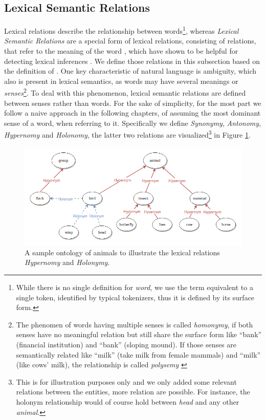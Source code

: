 \subsection{Lexical Semantic Relations}\label{sec:word_relations}
Lexical relations describe the relationship between words\footnote{While there is no single definition for \textit{word}, we use the term equivalent to a single token, identified by typical tokenizers, thus it is defined by its surface form.}, whereas \textit{Lexical Semantic Relations} are a special form of lexical relations, consisting of relations, that refer to the meaning of the word \citep{murphy2003semantic}, which have shown to be helpful for detecting lexical inferences \citep{dagan2009recognizing}. We define those relations in this subsection based on the definition of \cite{Jurafsky2008May}. One key characteristic of natural language is ambiguity, which also is present in lexical semantics, as words may have several meanings or \textit{senses}\footnote{The phenomen of words having multiple senses is called \textit{homonymy}, if both senses have no meaningful relation but still share the surface form like ``bank'' (financial institution) and ``bank'' (sloping mound). If those senses are semantically related like ``milk'' (take milk from female mammals) and ``milk'' (like cows' milk), the relationship is called \textit{polysemy} \citep{Jurafsky2008May}}. To deal with this phenomenon, lexical semantic relations are defined between senses rather than words. For the sake of simplicity, for the most part we follow a naive approach in the following chapters, of assuming the most dominant sense of a word, when referring to it. Specifically we define \textit{Synonymy}, \textit{Antonomy}, \textit{Hypernomy} and \textit{Holonomy}, the latter two relations are visualized\footnote{This is for illustration purposes only and we only added some relevant relations between the entities, more relation are possible. For instance, the holonym relationship would of course hold between \textit{head} and any other \textit{animal}.} in Figure \ref{fig:lexical_resources}.
\begin{figure}[tph!]
\centering
	\includegraphics[totalheight=7cm]{fig/lexical_relations.png}
	\caption{A sample ontology of animals to illustrate the lexical relations \textit{Hypernomy} and \textit{Holonymy}.}
	\label{fig:lexical_resources}
\end{figure}
